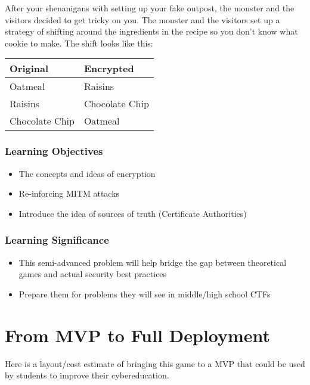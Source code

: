 \documentclass{article}
\begin{document}
After your shenanigans with setting up your fake outpost, the monster
and the visitors decided to get tricky on you. The monster and the
visitors set up a strategy of shifting around the ingredients in the
recipe so you don't know what cookie to make. The shift looks like
this: %
\begin{table}[h]
\centering
\begin{tabular}{l|l}
\textbf{Original}       & \textbf{Encrypted}      \\ \hline
Oatmeal        & Raisins        \\ \hline
Raisins        & Chocolate Chip \\ \hline
Chocolate Chip & Oatmeal        \\
\end{tabular}
\end{table}

\subsubsection{Learning Objectives}

\begin{itemize}
  \item The concepts and ideas of encryption
  \item Re-inforcing MITM attacks
  \item Introduce the idea of sources of truth (Certificate
    Authorities)
\end{itemize}

\subsubsection{Learning Significance}

\begin{itemize}
  \item This semi-advanced problem will help bridge the gap between
    theoretical games and actual security best practices
  \item Prepare them for problems they will see in middle/high school CTFs
\end{itemize}

\section{From MVP to Full Deployment}

Here is a layout/cost estimate of bringing this game to a MVP that
could be used by students to improve their cybereducation.
\end{document}
